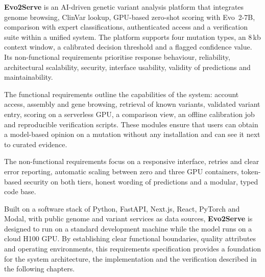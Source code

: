 \vspace{6pt}
\vspace{4pt}
\textbf{Evo2Serve} is an AI-driven genetic variant analysis platform that integrates genome browsing, ClinVar lookup, GPU-based zero-shot scoring with Evo~2-7B, comparison with expert classifications, authenticated access and a verification suite within a unified system. The platform supports four mutation types, an 8\,kb context window, a calibrated decision threshold and a flagged confidence value. Its non-functional requirements prioritise response behaviour, reliability, architectural scalability, security, interface usability, validity of predictions and maintainability.

The functional requirements outline the capabilities of the system: account access, assembly and gene browsing, retrieval of known variants, validated variant entry, scoring on a serverless GPU, a comparison view, an offline calibration job and reproducible verification scripts. These modules ensure that users can obtain a model-based opinion on a mutation without any installation and can see it next to curated evidence.

The non-functional requirements focus on a responsive interface, retries and clear error reporting, automatic scaling between zero and three GPU containers, token-based security on both tiers, honest wording of predictions and a modular, typed code base.

Built on a software stack of Python, FastAPI, Next.js, React, PyTorch and Modal, with public genome and variant services as data sources, \textbf{Evo2Serve} is designed to run on a standard development machine while the model runs on a cloud H100 GPU. By establishing clear functional boundaries, quality attributes and operating environments, this requirements specification provides a foundation for the system architecture, the implementation and the verification described in the following chapters.
